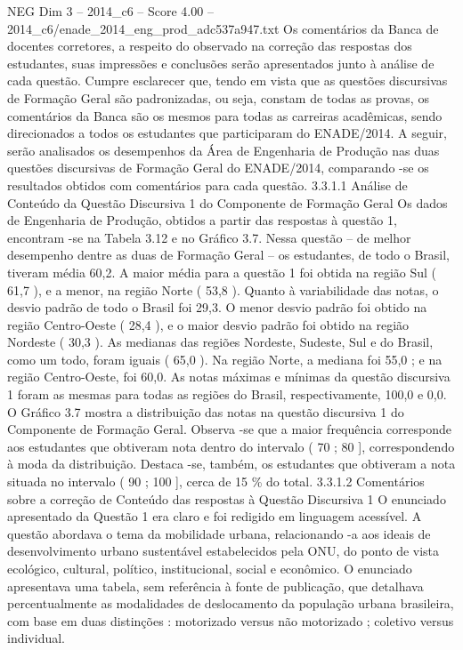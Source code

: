 \begin{textsample}{NEG Dim 3 – 2014\_c6 – Score 4.00 – 2014\_c6/enade\_2014\_eng\_prod\_adc537a947.txt}
Os comentários da Banca de docentes corretores, a respeito do observado na correção das respostas dos estudantes, suas impressões e conclusões serão apresentados junto à análise de cada questão.
Cumpre esclarecer que, tendo em vista que as questões discursivas de Formação Geral são padronizadas, ou seja, constam de todas as provas, os comentários da Banca são os mesmos para todas as carreiras acadêmicas, sendo direcionados a todos os estudantes que participaram do ENADE/2014.
A seguir, serão analisados os desempenhos da Área de Engenharia de Produção nas duas questões discursivas de Formação Geral do ENADE/2014, comparando -se os resultados obtidos com comentários para cada questão. 3.3.1.1 Análise de Conteúdo da Questão Discursiva 1 do Componente de Formação Geral Os dados de Engenharia de Produção, obtidos a partir das respostas à questão 1, encontram -se na Tabela 3.12 e no Gráfico 3.7.
Nessa questão – de melhor desempenho dentre as duas de Formação Geral – os estudantes, de todo o Brasil, tiveram média 60,2.
A maior média para a questão 1 foi obtida na região Sul ( 61,7 ), e a menor, na região Norte ( 53,8 ).
Quanto à variabilidade das notas, o desvio padrão de todo o Brasil foi 29,3.
O menor desvio padrão foi obtido na região Centro-Oeste ( 28,4 ), e o maior desvio padrão foi obtido na região Nordeste ( 30,3 ).
As medianas das regiões Nordeste, Sudeste, Sul e do Brasil, como um todo, foram iguais ( 65,0 ).
Na região Norte, a mediana foi 55,0 ; e na região Centro-Oeste, foi 60,0.
As notas máximas e mínimas da questão discursiva 1 foram as mesmas para todas as regiões do Brasil, respectivamente, 100,0 e 0,0.
O Gráfico 3.7 mostra a distribuição das notas na questão discursiva 1 do Componente de Formação Geral.
Observa -se que a maior frequência corresponde aos estudantes que obtiveram nota dentro do intervalo ( 70 ; 80 ], correspondendo à moda da distribuição.
Destaca -se, também, os estudantes que obtiveram a nota situada no intervalo ( 90 ; 100 ], cerca de 15 \% do total. 3.3.1.2 Comentários sobre a correção de Conteúdo das respostas à Questão Discursiva 1 O enunciado apresentado da Questão 1 era claro e foi redigido em linguagem acessível.
A questão abordava o tema da mobilidade urbana, relacionando -a aos ideais de desenvolvimento urbano sustentável estabelecidos pela ONU, do ponto de vista ecológico, cultural, político, institucional, social e econômico.
O enunciado apresentava uma tabela, sem referência à fonte de publicação, que detalhava percentualmente as modalidades de deslocamento da população urbana brasileira, com base em duas distinções : motorizado versus não motorizado ; coletivo versus individual.

\end{textsample}
